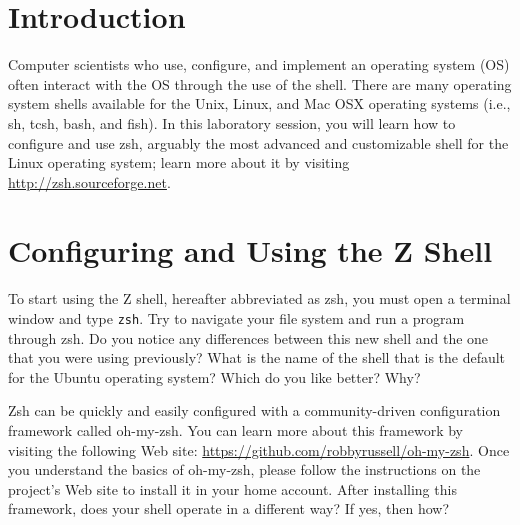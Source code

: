 

\usepackage[compact]{titlesec}



\section*{Introduction}


Computer scientists who use, configure, and implement an operating system (OS) often interact with the OS through the use of
the shell.  There are many operating system shells available for the Unix, Linux, and Mac OSX operating systems (i.e., sh, tcsh, bash,
and fish).  In this laboratory session, you will learn how to configure and use zsh, arguably the most advanced and customizable
shell for the Linux operating system; learn more about it by visiting \url{http://zsh.sourceforge.net}.

\section*{Configuring and Using the Z Shell}

To start using the Z shell, hereafter abbreviated as zsh, you must open a terminal window and type {\tt zsh}.  Try to navigate
your file system and run a program through zsh.  Do you notice any differences between this new shell and the one that you were
using previously?  What is the name of the shell that is the default for the Ubuntu operating system? Which do you like better?
Why?

Zsh can be quickly and easily configured with a community-driven configuration framework called oh-my-zsh.  You can learn more
about this framework by visiting the following Web site: \url{https://github.com/robbyrussell/oh-my-zsh}. Once you understand the
basics of oh-my-zsh, please follow the instructions on the project's Web site to install it in your home account. After installing
this framework, does your shell operate in a different way? If yes, then how?

